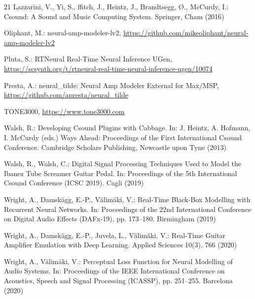 \documentclass[runningheads,a4paper]{llncs}
\begin{document}
\begin{thebibliography}{21}
 Lazzarini, V., Yi, S., ffitch, J., Heintz,
J., Brandtsegg, {\O}., McCurdy, I.: Csound: A Sound and Music Computing
System. Springer, Cham (2016)

 Oliphant, M.: neural-amp-modeler-lv2,
\url{https://github.com/mikeoliphant/neural-amp-modeler-lv2}

 Pluta, S.: RTNeural Real-Time Neural Inference
UGen, \url{https://scsynth.org/t/rtneural-real-time-neural-inference-ugen/10074}

 Presta, A.: neural\_tilde: Neural Amp Modeler
External for Max/MSP, \url{https://github.com/apresta/neural_tilde}

 TONE3000, \url{https://www.tone3000.com}

 Walsh, R.: Developing Csound Plugins with
Cabbage. In: J. Heintz, A. Hofmann, I. McCurdy (eds.) Ways Ahead:
Proceedings of the First International Csound Conference. Cambridge
Scholars Publishing, Newcastle upon Tyne (2013)

 Walsh, R., Walsh, C.: Digital Signal
Processing Techniques Used to Model the Ibanez Tube Screamer Guitar
Pedal. In: Proceedings of the 5th International Csound Conference
(ICSC 2019). Cagli (2019)

 Wright, A., Damsk\"agg, E.-P., V\"alim\"aki, V.:
Real-Time Black-Box Modelling with Recurrent Neural Networks. In:
Proceedings of the 22nd International Conference on Digital Audio Effects
(DAFx-19), pp. 173--180. Birmingham (2019)

 Wright, A., Damsk\"agg, E.-P., Juvela, L.,
V\"alim\"aki, V.: Real-Time Guitar Amplifier Emulation with Deep
Learning. Applied Sciences 10(3), 766 (2020)

 Wright, A., V\"alim\"aki, V.: Perceptual
Loss Function for Neural Modelling of Audio Systems. In: Proceedings of
the IEEE International Conference on Acoustics, Speech and Signal
Processing (ICASSP), pp. 251--255. Barcelona (2020)

\end{thebibliography}
\end{document}
